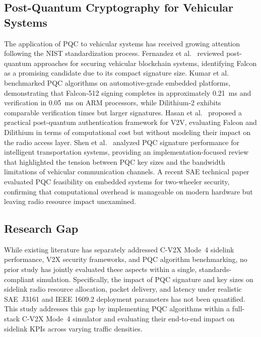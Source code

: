\documentclass[letterpaper,journal]{IEEEtran}
\begin{document}
\subsection{Post-Quantum Cryptography for Vehicular Systems}

The application of PQC to vehicular systems has received growing attention following the NIST standardization process. Fernandez et al.~\cite{fernandez2023pqc_v2x} reviewed post-quantum approaches for securing vehicular blockchain systems, identifying Falcon as a promising candidate due to its compact signature size. Kumar et al.~\cite{kumar2024pqc_automotive} benchmarked PQC algorithms on automotive-grade embedded platforms, demonstrating that Falcon-512 signing completes in approximately 0.21~ms and verification in 0.05~ms on ARM processors, while Dilithium-2 exhibits comparable verification times but larger signatures. Hasan et al.~\cite{hasan2022pqc_v2v} proposed a practical post-quantum authentication framework for V2V, evaluating Falcon and Dilithium in terms of computational cost but without modeling their impact on the radio access layer. Shen et al.~\cite{shen2025pqc_analysis} analyzed PQC signature performance for intelligent transportation systems, providing an implementation-focused review that highlighted the tension between PQC key sizes and the bandwidth limitations of vehicular communication channels. A recent SAE technical paper~\cite{sae2026pqc_twowheeler} evaluated PQC feasibility on embedded systems for two-wheeler security, confirming that computational overhead is manageable on modern hardware but leaving radio resource impact unexamined.

\subsection{Research Gap}

While existing literature has separately addressed C-V2X Mode~4 sidelink performance, V2X security frameworks, and PQC algorithm benchmarking, no prior study has jointly evaluated these aspects within a single, standards-compliant simulation. Specifically, the impact of PQC signature and key sizes on sidelink radio resource allocation, packet delivery, and latency under realistic SAE~J3161 and IEEE 1609.2 deployment parameters has not been quantified. This study addresses this gap by implementing PQC algorithms within a full-stack C-V2X Mode~4 simulator and evaluating their end-to-end impact on sidelink KPIs across varying traffic densities.
\end{document}
